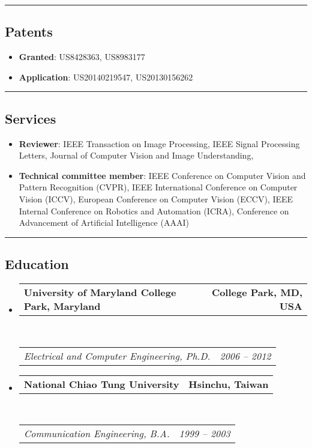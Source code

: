 \documentclass[10pt,letterpaper]{article}
\makeatletter
\newcommand{\headerrow}[2]
{\begin{tabular*}{\linewidth}{l@{\extracolsep{\fill}}r}
	#1 &
	#2 \\
\end{tabular*}}
\makeatother
\begin{document}
\hrule
\vspace{-0.4em}
\subsection*{Patents}
\begin{itemize}
\item {\bf Granted}: US8428363, US8983177 \vspace{-2mm}
\item {\bf Application}: US20140219547, US20130156262\vspace{-2mm}
\end{itemize}

\hrule
\vspace{-0.4em}
\subsection*{Services}
\begin{itemize}
\item {\bf Reviewer}: IEEE Transaction on Image Processing, IEEE Signal Processing Letters, Journal of Computer Vision and Image Understanding, \vspace{-2mm}
\item {\bf Technical committee member}: IEEE Conference on Computer Vision and Pattern Recognition (CVPR), IEEE International Conference on Computer Vision (ICCV), European Conference on Computer Vision (ECCV), IEEE Internal Conference on Robotics and Automation (ICRA), Conference on Advancement of Artificial Intelligence (AAAI)\vspace{-2mm}
\end{itemize}

\hrule
\vspace{-0.4em}
\subsection*{Education}

\begin{itemize}
	\parskip=0.1em

	\item
	\headerrow
		{\textbf{University of Maryland College Park, Maryland}}
		{\textbf{College Park, MD, USA}}
	\\
	\headerrow
		{\emph{Electrical and Computer Engineering, Ph.D.}}
		{\emph{2006 -- 2012}}
	\item
	\headerrow
		{\textbf{National Chiao Tung University}}
		{\textbf{Hsinchu, Taiwan}}
	\\
	\headerrow
		{\emph{Communication Engineering, B.A.}}
		{\emph{1999 -- 2003}}

\end{itemize}
\end{document}
